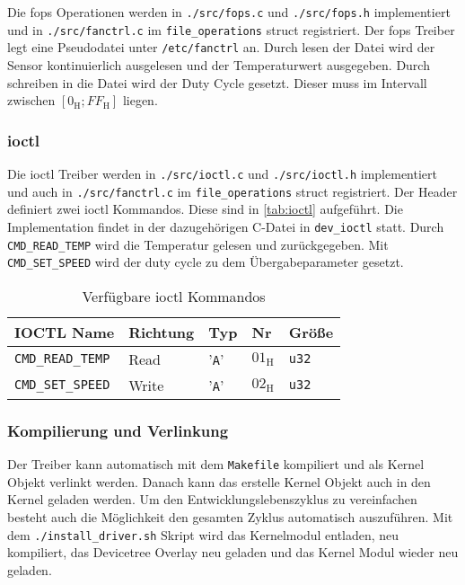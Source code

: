 Die \gls{fops} Operationen werden in \texttt{./src/fops.c} und \texttt{./src/fops.h} implementiert und in \texttt{./src/fanctrl.c} im \texttt{file\_operations} struct registriert.
Der \gls{fops} Treiber legt eine Pseudodatei unter \texttt{/etc/fanctrl} an.
Durch lesen der Datei wird der Sensor kontinuierlich ausgelesen und der Temperaturwert ausgegeben.
Durch schreiben in die Datei wird der Duty Cycle gesetzt.
Dieser muss im Intervall zwischen $\left[0_{\text{H}}; FF_{\text{H}}\right]$ liegen.

\subsubsection{\Acrshort{ioctl}}

Die \gls{ioctl} Treiber werden in \texttt{./src/ioctl.c} und \texttt{./src/ioctl.h} implementiert und auch in \texttt{./src/fanctrl.c} im \texttt{file\_operations} struct registriert.
Der Header definiert zwei \gls{ioctl} Kommandos.
Diese sind in \autoref{tab:ioctl} aufgeführt.
Die Implementation findet in der dazugehörigen C-Datei in \texttt{dev\_ioctl} statt.
Durch \texttt{CMD\_READ\_TEMP} wird die Temperatur gelesen und zurückgegeben.
Mit \texttt{CMD\_SET\_SPEED} wird der duty cycle zu dem Übergabeparameter gesetzt.

\begin{table}[h]
    \centering
    \begin{tabular}{|l|l|l|l|l|}
        \hline
        \textbf{IOCTL Name} & \textbf{Richtung} & \textbf{Typ} & \textbf{Nr} & \textbf{Größe} \\
        \hline
        \hline
        \texttt{CMD\_READ\_TEMP} & Read & '\texttt{A}' & $01_{\text{H}}$ & \texttt{u32} \\
        \hline
        \texttt{CMD\_SET\_SPEED} & Write & '\texttt{A}' & $02_{\text{H}}$ & \texttt{u32} \\
        \hline
    \end{tabular}
    \caption{Verfügbare \acrshort{ioctl} Kommandos}
    \label{tab:ioctl}
\end{table}

\subsubsection{Kompilierung und Verlinkung}

Der Treiber kann automatisch mit dem \texttt{Makefile} kompiliert und als Kernel Objekt verlinkt werden.
Danach kann das erstelle Kernel Objekt auch in den Kernel geladen werden.
Um den Entwicklungslebenszyklus zu vereinfachen besteht auch die Möglichkeit den gesamten Zyklus automatisch auszuführen.
Mit dem \texttt{./install\_driver.sh} Skript wird das Kernelmodul entladen, neu kompiliert, das Devicetree Overlay neu geladen und das Kernel Modul wieder neu geladen.
